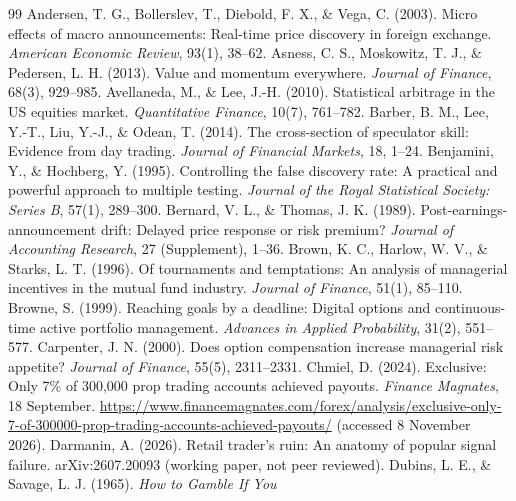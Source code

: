 \documentclass[11pt]{article}
\begin{document}
\raggedright
\begin{thebibliography}{99}
 Andersen, T. G., Bollerslev, T., Diebold, F. X., \& Vega, C. (2003).
Micro effects of macro announcements: Real-time price discovery in foreign exchange. \emph{American Economic
Review}, 93(1), 38--62.
 Asness, C. S., Moskowitz, T. J., \& Pedersen, L. H. (2013). Value and
momentum everywhere. \emph{Journal of Finance}, 68(3), 929--985.
 Avellaneda, M., \& Lee, J.-H. (2010). Statistical arbitrage in
the US equities market. \emph{Quantitative Finance}, 10(7), 761--782.
 Barber, B. M., Lee, Y.-T., Liu, Y.-J., \& Odean, T. (2014). The
cross-section of speculator skill: Evidence from day trading. \emph{Journal of Financial Markets}, 18, 1--24.
 Benjamini, Y., \& Hochberg, Y. (1995). Controlling the false
discovery rate: A practical and powerful approach to multiple testing. \emph{Journal of the Royal Statistical
Society: Series B}, 57(1), 289--300.
 Bernard, V. L., \& Thomas, J. K. (1989). Post-earnings-announcement
drift: Delayed price response or risk premium? \emph{Journal of Accounting Research}, 27 (Supplement), 1--36.
 Brown, K. C., Harlow, W. V., \& Starks, L. T. (1996). Of tournaments and
temptations: An analysis of managerial incentives in the mutual fund industry. \emph{Journal of Finance}, 51(1),
85--110.
 Browne, S. (1999). Reaching goals by a deadline: Digital options and
continuous-time active portfolio management. \emph{Advances in Applied Probability}, 31(2), 551--577.
 Carpenter, J. N. (2000). Does option compensation increase managerial
risk appetite? \emph{Journal of Finance}, 55(5), 2311--2331.
 Chmiel, D. (2024). Exclusive: Only 7\% of 300,000 prop trading accounts
achieved payouts. \emph{Finance Magnates}, 18 September.
\url{https://www.financemagnates.com/forex/analysis/exclusive-only-7-of-300000-prop-trading-accounts-achieved-payouts/}
(accessed 8 November 2026).
 Darmanin, A. (2026). Retail trader's ruin: An anatomy of popular signal
failure. arXiv:2607.20093 (working paper, not peer reviewed).
 Dubins, L. E., \& Savage, L. J. (1965). \emph{How to Gamble If You
}
\end{thebibliography}
\end{document}
